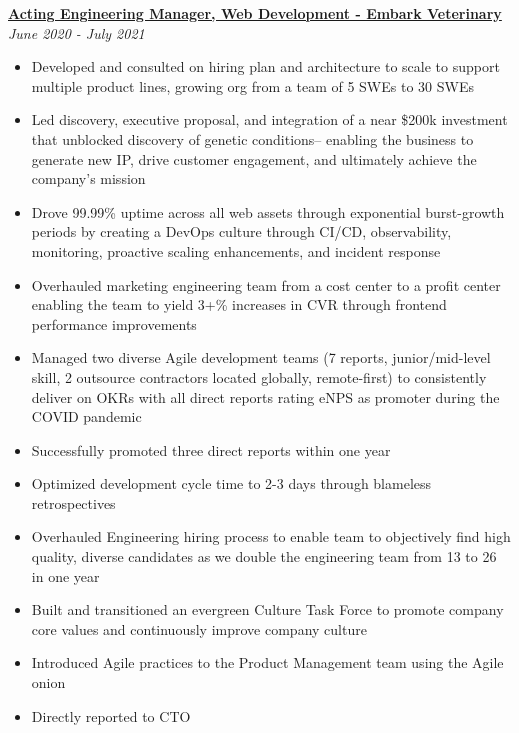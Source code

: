 \documentclass[line]{res}
\begin{document}
\begin{resume}
{\bf \underline{Acting Engineering Manager, Web Development - Embark Veterinary }} \hfill {\sl June 2020 - July 2021}\\[2pt]
 \begin{itemize} \itemsep -1pt %
	\item Developed and consulted on hiring plan and architecture to scale to support multiple product lines, growing org from a team of 5 SWEs to 30 SWEs
	\item Led discovery, executive proposal, and integration of a near \$200k investment that unblocked discovery of genetic conditions-- enabling the business to generate new IP, drive customer engagement, and ultimately achieve the company's mission
	\item Drove 99.99\% uptime across all web assets through exponential burst-growth periods by creating a DevOps culture through CI/CD, observability, monitoring, proactive scaling enhancements, and incident response
	\item Overhauled marketing engineering team from a cost center to a profit center enabling the team to yield 3+\% increases in CVR through frontend performance improvements
	\item Managed two diverse Agile development teams (7 reports, junior/mid-level skill, 2 outsource contractors located globally, remote-first) to consistently deliver on OKRs with all direct reports rating eNPS as promoter during the COVID pandemic
	\item Successfully promoted three direct reports within one year
	\item Optimized development cycle time to 2-3 days through blameless retrospectives
	\item Overhauled Engineering hiring process to enable team to objectively find high quality, diverse candidates as we double the engineering team from 13 to 26 in one year
	\item Built and transitioned an evergreen Culture Task Force to promote company core values and continuously improve company culture
	\item Introduced Agile practices to the Product Management team using the Agile onion
	\item Directly reported to CTO
 \end{itemize}
 

\end{resume}
\end{document}

